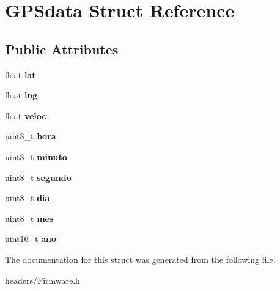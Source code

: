 \section{G\+P\+Sdata Struct Reference}
\label{struct_g_p_sdata}
\subsection*{Public Attributes}
\begin{DoxyCompactItemize}
\item 
float {\bfseries lat}\label{struct_g_p_sdata_a3e25922787c14c30f3f26a2eece097d1}

\item 
float {\bfseries lng}\label{struct_g_p_sdata_aae94cbf7f0fbf195c33090fc3945adf0}

\item 
float {\bfseries veloc}\label{struct_g_p_sdata_a5231106fe807b189dd9fc5b8171041c5}

\item 
uint8\+\_\+t {\bfseries hora}\label{struct_g_p_sdata_a013f9155a4c6b1e0f493b984b9e84a6a}

\item 
uint8\+\_\+t {\bfseries minuto}\label{struct_g_p_sdata_a112c61e2fcb3999ec95e81e6533ba3fa}

\item 
uint8\+\_\+t {\bfseries segundo}\label{struct_g_p_sdata_a7e1a14d319a7639e66bda3f25803bfd6}

\item 
uint8\+\_\+t {\bfseries dia}\label{struct_g_p_sdata_ad6ce9b5b85d8fd3ac361f32de685273b}

\item 
uint8\+\_\+t {\bfseries mes}\label{struct_g_p_sdata_a4d6e358978870f329256c8a7f3b9e600}

\item 
uint16\+\_\+t {\bfseries ano}\label{struct_g_p_sdata_a2d451916612ef63252f0bcf92b8691a6}

\end{DoxyCompactItemize}


The documentation for this struct was generated from the following file\+:\begin{DoxyCompactItemize}
\item 
headers/Firmware.\+h\end{DoxyCompactItemize}
